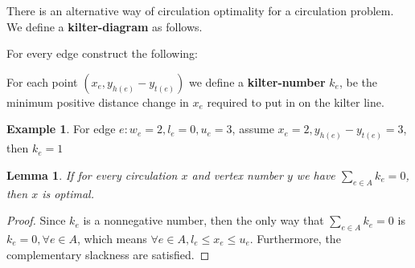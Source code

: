 \documentclass[10pt, twocolumn]{book}
\theoremstyle{definition}
\newtheorem*{example}{Example}
\theoremstyle{plain}
\newtheorem{lemma}[theorem]{Lemma}
\theoremstyle{remark}
\begin{document}
			There is an alternative way of circulation optimality for a circulation problem. We define a \textbf{kilter-diagram} as follows.

			For every edge construct the following:
			\begin{figure}[!ht]
				\centering
			\end{figure}

			For each point $(x_e, y_{h(e)} - y_{t(e)})$ we define a \textbf{kilter-number} $k_e$, be the minimum positive distance change in $x_e$ required to put in on the kilter line.
			\begin{example}
				For edge $e: w_e = 2, l_e = 0, u_e = 3$, assume $x_e = 2, y_{h(e)} - y_{t(e)} = 3$, then $k_e = 1$
			\end{example}

			\begin{figure}[!ht]
				\centering
			\end{figure}

			\begin{lemma}
				If for every circulation $x$ and vertex number $y$ we have $\sum_{e \in A} k_e = 0$, then $x$ is optimal.
			\end{lemma}

			\begin{proof}
				Since $k_e$ is a nonnegative number, then the only way that $\sum_{e \in A} k_e = 0$ is $k_e = 0, \forall e\in A$, which means $\forall e\in A, l_e \le x_e \le u_e$. Furthermore, the complementary slackness are satisfied.
			\end{proof}
\end{document}
